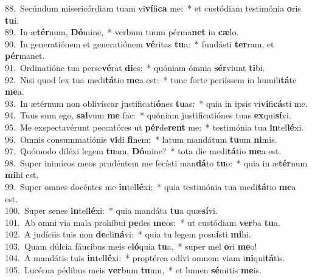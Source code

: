 {88.~}Secúndum misericórdiam tuam vi\textbf{ví}fi\textbf{ca} me:~* et custódiam testimónia \textbf{o}ris \textbf{tu}i.\\
{89.~}In æ\textbf{tér}num, \textbf{Dó}mine,~* verbum tuum pérma\textbf{net} in \textbf{cæ}lo.\\
{90.~}In generatiónem et generatiónem \textbf{vé}ritas \textbf{tu}a:~* fundásti \textbf{ter}ram, et \textbf{pér}manet.\\
{91.~}Ordinatióne tua perse\textbf{vé}rat \textbf{di}es:~* quóniam ómnia \textbf{sér}viunt \textbf{ti}bi.\\
{92.~}Nisi quod lex tua medi\textbf{tá}tio \textbf{me}a est:~* tunc forte periíssem in humili\textbf{tá}te \textbf{me}a.\\
{93.~}In ætérnum non oblivíscar justificati\textbf{ó}nes \textbf{tu}as:~* quia in ipsis vi\textbf{vi}fi\textbf{cá}sti me.\\
{94.~}Tuus sum ego, \textbf{sal}vum \textbf{me} fac:~* quóniam justificatiónes tuas \textbf{ex}qui\textbf{sí}vi.\\
{95.~}Me exspectavérunt peccatóres ut \textbf{pér}de\textbf{rent} me:~* testimónia tua \textbf{in}tel\textbf{lé}xi.\\
{96.~}Omnis consummatiónis \textbf{vi}di \textbf{fi}nem:~* latum mandátum \textbf{tu}um \textbf{ni}mis.\\
{97.~}Quómodo diléxi legem \textbf{tu}am, \textbf{Dó}mine?~* tota die medi\textbf{tá}tio \textbf{me}a est.\\
{98.~}Super inimícos meos prudéntem me fecísti man\textbf{dá}to \textbf{tu}o:~* quia in æ\textbf{tér}num \textbf{mi}hi est.\\
{99.~}Super omnes docéntes me \textbf{in}tel\textbf{lé}xi:~* quia testimónia tua medi\textbf{tá}tio \textbf{me}a est.\\
{100.~}Super senes \textbf{in}tel\textbf{lé}xi:~* quia mandáta \textbf{tu}a quæ\textbf{sí}vi.\\
{101.~}Ab omni via mala prohíbui \textbf{pe}des \textbf{me}os:~* ut custódiam \textbf{ver}ba \textbf{tu}a.\\
{102.~}A judíciis tuis non \textbf{de}cli\textbf{ná}vi:~* quia tu legem posu\textbf{í}sti \textbf{mi}hi.\\
{103.~}Quam dúlcia fáucibus meis e\textbf{ló}quia \textbf{tu}a,~* super mel \textbf{o}ri \textbf{me}o!\\
{104.~}A mandátis tuis \textbf{in}tel\textbf{lé}xi:~* proptérea odívi omnem viam i\textbf{ni}qui\textbf{tá}tis.\\
{105.~}Lucérna pédibus meis \textbf{ver}bum \textbf{tu}um,~* et lumen \textbf{sé}mitis \textbf{me}is.\\
